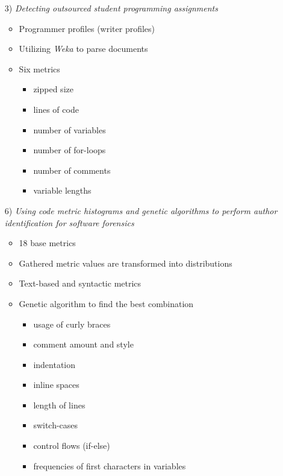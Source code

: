 \documentclass[t,12pt,pdftex]{beamer}
\begin{document}
\begin{frame}
	\vspace{0.5in}
	\begin{itemize}
		\item[3)] \textit{Detecting outsourced student
programming assignments}
		\begin{itemize}
			\item Programmer profiles (writer profiles)
			\item Utilizing \textit{Weka} to parse documents
			\item Six metrics
			\begin{itemize}
				\item zipped size
				\item lines of code
				\item number of variables
				\item number of for-loops
				\item number of comments
				\item variable lengths
			\end{itemize}
		\end{itemize}
	\end{itemize}
\end{frame}

\begin{frame}
	\vspace{0.5in}
	\begin{itemize}
		\item[6)] \textit{Using code metric histograms and genetic algorithms to perform author identification for software forensics}
		\begin{itemize}
			\item 18 base metrics 
			\item Gathered metric values are transformed into distributions
			\item Text-based and syntactic metrics
			\item Genetic algorithm to find the best combination
			\begin{itemize}
				\item usage of curly braces
				\item comment amount and style
				\item indentation
				\item inline spaces
				\item length of lines
				\item switch-cases
				\item control flows (if-else)
				\item frequencies of first characters in variables
			\end{itemize}
		\end{itemize}
	\end{itemize}
\end{frame}
\end{document}
